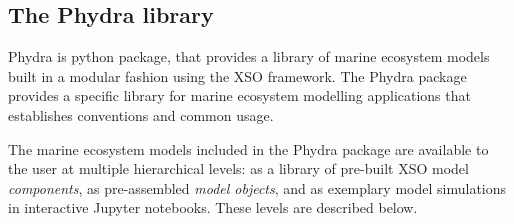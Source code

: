 \documentclass[journal abbreviation, manuscript]{copernicus}
\begin{document}

    



\subsection{The Phydra library} \label{Section:PhydraLibrary}
Phydra is python package, that provides a library of marine ecosystem models built in a modular fashion using the XSO framework. The Phydra package provides a specific library for marine ecosystem modelling applications that establishes conventions and common usage.

 
The marine ecosystem models included in the Phydra package are available to the user at multiple hierarchical levels: as a library of pre-built XSO model \textit{components}, as pre-assembled \textit{model objects}, and as exemplary model simulations in interactive Jupyter notebooks. These levels are described below.
\end{document}
